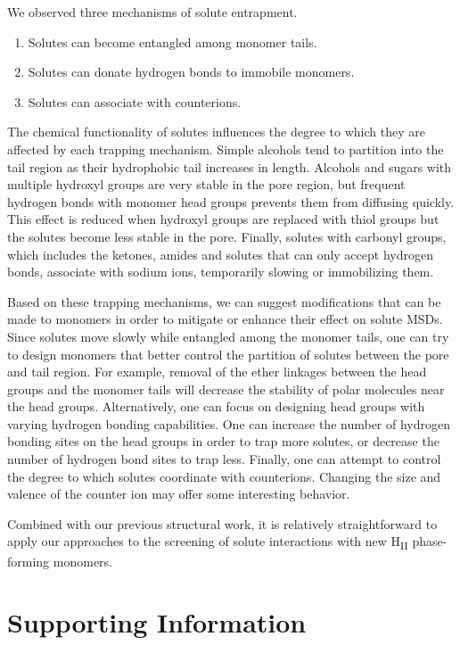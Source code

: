 \documentclass[journal=jpcbfk,manuscript=article]{achemso}
\begin{document}
  We observed three mechanisms of solute entrapment.
  \begin{enumerate}
    \item Solutes can become entangled among monomer tails. 
    \item Solutes can donate hydrogen bonds to immobile monomers.
    \item Solutes can associate with counterions.
  \end{enumerate}
  
  The chemical functionality of solutes influences the degree to which
  they are affected by each trapping mechanism. Simple alcohols tend to
  partition into the tail region as their hydrophobic tail increases in length.
  Alcohols and sugars with multiple hydroxyl groups are very stable
  in the pore region, but frequent hydrogen bonds with monomer head 
  groups prevents them from diffusing quickly. This effect is reduced when
  hydroxyl groups are replaced with thiol groups but the solutes become less
  stable in the pore. Finally, solutes with carbonyl groups, which includes
  the ketones, amides and solutes that can only accept hydrogen bonds, associate
  with sodium ions, temporarily slowing or immobilizing them. 
  
  Based on these trapping mechanisms, we can suggest modifications that
  can be made to monomers in order to mitigate or enhance their effect on
  solute MSDs. Since solutes move slowly while entangled among the monomer
  tails, one can try to design monomers that better control the partition
  of solutes between the pore and tail region. For example, removal of the 
  ether linkages between the head groups and the monomer tails will decrease
  the stability of polar molecules near the head groups. Alternatively, one
  can focus on designing head groups with varying hydrogen bonding capabilities.
  One can increase the number of hydrogen bonding sites on the head groups
  in order to trap more solutes, or decrease the number of hydrogen bond sites
  to trap less. Finally, one can attempt to control the degree to which solutes
  coordinate with counterions. Changing the size and valence of the counter 
  ion may offer some interesting behavior. 
  
  Combined with our previous structural work, it is relatively straightforward
  to apply our approaches to the screening of solute interactions with new 
  H\textsubscript{II} phase-forming monomers.

  \section*{Supporting Information}
\end{document}
